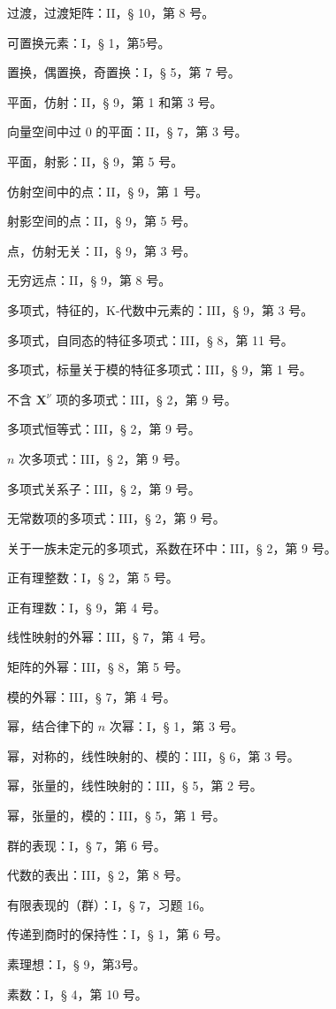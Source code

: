 过渡，过渡矩阵：II，§ 10，第 8 号。

可置换元素：I，§ 1，第5号。

置换，偶置换，奇置换：I，§ 5，第 7 号。

平面，仿射：II，§ 9，第 1 和第 3 号。

向量空间中过 0 的平面：II，§ 7，第 3 号。

平面，射影：II，§ 9，第 5 号。

仿射空间中的点：II，§ 9，第 1 号。

射影空间的点：II，§ 9，第 5 号。

点，仿射无关：II，§ 9，第 3 号。

无穷远点：II，§ 9，第 8 号。

多项式，特征的，K-代数中元素的：III，§ 9，第 3 号。

多项式，自同态的特征多项式：III，§ 8，第 11 号。

多项式，标量关于模的特征多项式：III，§ 9，第 1 号。

不含 \(\mathbf{X}^{\nu}\) 项的多项式：III，§ 2，第 9 号。

多项式恒等式：III，§ 2，第 9 号。

\(n\) 次多项式：III，§ 2，第 9 号。

多项式关系子：III，§ 2，第 9 号。

无常数项的多项式：III，§ 2，第 9 号。

关于一族未定元的多项式，系数在环中：III，§ 2，第 9 号。

正有理整数：I，§ 2，第 5 号。

正有理数：I，§ 9，第 4 号。

线性映射的外幂：III，§ 7，第 4 号。

矩阵的外幂：III，§ 8，第 5 号。

模的外幂：III，§ 7，第 4 号。

幂，结合律下的 \(n\) 次幂：I，§ 1，第 3 号。

幂，对称的，线性映射的、模的：III，§ 6，第 3 号。

幂，张量的，线性映射的：III，§ 5，第 2 号。

幂，张量的，模的：III，§ 5，第 1 号。

群的表现：I，§ 7，第 6 号。

代数的表出：III，§ 2，第 8 号。

有限表现的（群）：I，§ 7，习题 16。

传递到商时的保持性：I，§ 1，第 6 号。

素理想：I，§ 9，第3号。

素数：I，§ 4，第 10 号。

